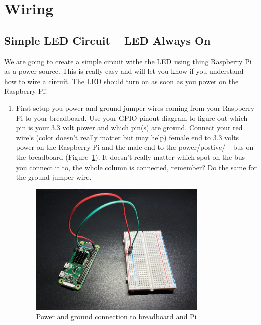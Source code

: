 \documentclass{article}\usepackage[]{graphicx}\usepackage[]{color}
\begin{document}
\section{Wiring}

\subsection{Simple LED Circuit -- LED Always On}

We are going to create a simple circuit withe the LED using thing Raspberry Pi as a power source. This is really easy and will let you know if you understand how to wire a circuit. The LED should turn on as soon as you power on the Raspberry Pi!

\begin{enumerate}
\item First setup you power and ground jumper wires coming from your Raspberry Pi to your breadboard. Use your GPIO pinout diagram to figure out which pin is your 3.3 volt power and which pin(s) are ground. Connect your red wire's (color doesn't really matter but may help) female end to 3.3 volts power on the Raspberry Pi and the male end to the power/postive/+ bus on the breadboard (Figure~\ref{fig:pwrgrd}). It doesn't really matter which spot on the bus you connect it to, the whole column is connected, remember? Do the same for the ground jumper wire.

\begin{figure}
\includegraphics[width=0.80\textwidth]{pwrgnd}
\caption{Power and ground connection to breadboard and Pi}
\label{fig:pwrgrd}
\end{figure}


\end{enumerate}
\end{document}
